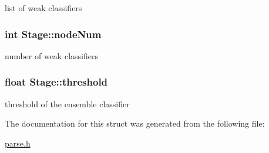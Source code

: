 list of weak classifiers 

\hypertarget{structStage_a350f9d0cf41551e1ec0f8387a44f7eb8}{}
\subsubsection[{node\+Num}]{\setlength{\rightskip}{0pt plus 5cm}int Stage\+::node\+Num}\label{structStage_a350f9d0cf41551e1ec0f8387a44f7eb8}


number of weak classifiers 

\hypertarget{structStage_ac3a6bd092f13376a27af866314a4d3a6}{}
\subsubsection[{threshold}]{\setlength{\rightskip}{0pt plus 5cm}float Stage\+::threshold}\label{structStage_ac3a6bd092f13376a27af866314a4d3a6}


threshold of the ensemble classifier 



The documentation for this struct was generated from the following file\+:\begin{DoxyCompactItemize}
\item 
\hyperlink{parse_8h}{parse.\+h}\end{DoxyCompactItemize}
